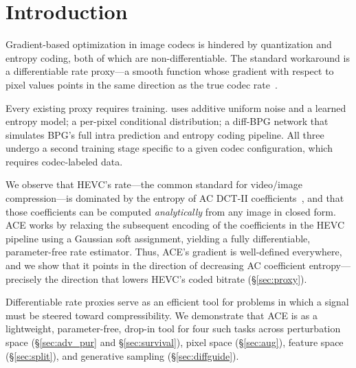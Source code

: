 \section{Introduction}

Gradient-based optimization in image codecs is hindered by quantization and entropy coding, both of which are non-differentiable.
The standard workaround is a differentiable rate proxy---a smooth function whose gradient with respect to pixel values points in the same direction as the true codec rate~\citep{balle2018variational,guo2026generative}.

Every existing proxy requires training.
\citet{balle2018variational} uses additive uniform noise and a learned entropy model; \citet{mentzer2018conditional} a per-pixel conditional distribution; \citet{guo2026generative} a diff-BPG network that simulates BPG's full intra prediction and entropy coding pipeline.
All three undergo a second training stage specific to a given codec configuration, which requires codec-labeled data.

We observe that HEVC's rate---the common standard for video/image compression---is dominated by the entropy of AC DCT-II coefficients~\citep{sullivan2012hevc}, and that those coefficients can be computed \emph{analytically} from any image in closed form.
ACE works by relaxing the subsequent encoding of the coefficients in the HEVC pipeline using a Gaussian soft assignment, yielding a fully differentiable, parameter-free rate estimator.
Thus, ACE's gradient is well-defined everywhere, and we show that it points in the direction of decreasing AC coefficient entropy---precisely the direction that lowers HEVC's coded bitrate (\S\ref{sec:proxy}).

Differentiable rate proxies serve as an efficient tool for problems in which a signal must be steered toward compressibility.
We demonstrate that ACE is as a lightweight, parameter-free, drop-in tool for four such tasks across perturbation space (\S\ref{sec:adv_pur} and \S\ref{sec:survival}), pixel space (\S\ref{sec:aug}), feature space (\S\ref{sec:split}), and generative sampling (\S\ref{sec:diffguide}).